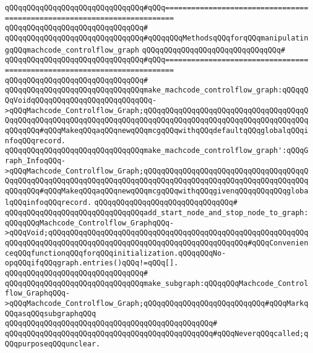 \newline
\verb|qQQqqQQqqQQqqQQqqQQqqQQqqQQqqQQq#qQQq========================================================================|\newline
\verb|qQQqqQQqqQQqqQQqqQQqqQQqqQQqqQQq#|\newline
\verb|qQQqqQQqqQQqqQQqqQQqqQQqqQQqqQQq#qQQqqQQqMethodsqQQqforqQQqmanipulatingqQQqmachcode_controlflow_graph|\newline
\verb|qQQqqQQqqQQqqQQqqQQqqQQqqQQqqQQq#|\newline
\verb|qQQqqQQqqQQqqQQqqQQqqQQqqQQqqQQq#qQQq========================================================================|\newline
\verb|qQQqqQQqqQQqqQQqqQQqqQQqqQQqqQQq#|\newline
\verb|qQQqqQQqqQQqqQQqqQQqqQQqqQQqqQQqmake_machcode_controlflow_graph:qQQqqQQqVoidqQQqqQQqqQQqqQQqqQQqqQQqqQQq->qQQqMachcode_Controlflow_Graph;qQQqqQQqqQQqqQQqqQQqqQQqqQQqqQQqqQQqqQQqqQQqqQQqqQQqqQQqqQQqqQQqqQQqqQQqqQQqqQQqqQQqqQQqqQQqqQQqqQQqqQQqqQQqqQQqqQQq#qQQqMakeqQQqaqQQqnewqQQqmcgqQQqwithqQQqdefaultqQQqglobalqQQqinfoqQQqrecord.|\newline
\verb|qQQqqQQqqQQqqQQqqQQqqQQqqQQqqQQqmake_machcode_controlflow_graph':qQQqGraph_InfoqQQq->qQQqMachcode_Controlflow_Graph;qQQqqQQqqQQqqQQqqQQqqQQqqQQqqQQqqQQqqQQqqQQqqQQqqQQqqQQqqQQqqQQqqQQqqQQqqQQqqQQqqQQqqQQqqQQqqQQqqQQqqQQqqQQqqQQqqQQq#qQQqMakeqQQqaqQQqnewqQQqmcgqQQqwithqQQqgivenqQQqqQQqqQQqglobalqQQqinfoqQQqrecord.|\newline
\verb|qQQqqQQqqQQqqQQqqQQqqQQqqQQqqQQq#|\newline
\verb|qQQqqQQqqQQqqQQqqQQqqQQqqQQqqQQqadd_start_node_and_stop_node_to_graph:qQQqqQQqMachcode_Controlflow_GraphqQQq->qQQqVoid;qQQqqQQqqQQqqQQqqQQqqQQqqQQqqQQqqQQqqQQqqQQqqQQqqQQqqQQqqQQqqQQqqQQqqQQqqQQqqQQqqQQqqQQqqQQqqQQqqQQqqQQqqQQqqQQqqQQq#qQQqConvenienceqQQqfunctionqQQqforqQQqinitialization.qQQqqQQqNo-opqQQqifqQQqgraph.entries()qQQq!=qQQq[].|\newline
\verb|qQQqqQQqqQQqqQQqqQQqqQQqqQQqqQQq#|\newline
\verb|qQQqqQQqqQQqqQQqqQQqqQQqqQQqqQQqmake_subgraph:qQQqqQQqMachcode_Controlflow_GraphqQQq->qQQqMachcode_Controlflow_Graph;qQQqqQQqqQQqqQQqqQQqqQQqqQQq#qQQqMarkqQQqasqQQqsubgraphqQQq|\newline
\verb|qQQqqQQqqQQqqQQqqQQqqQQqqQQqqQQqqQQqqQQqqQQqqQQq#|\newline
\verb|qQQqqQQqqQQqqQQqqQQqqQQqqQQqqQQqqQQqqQQqqQQqqQQq#qQQqNeverqQQqcalled;qQQqpurposeqQQqunclear.|\newline

